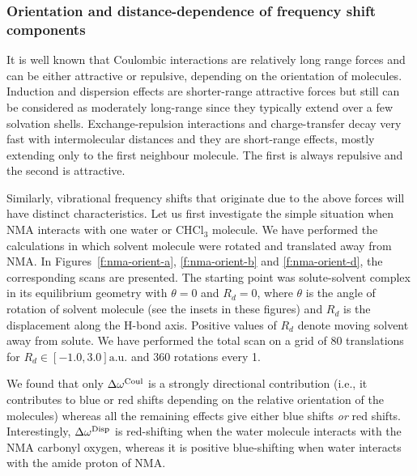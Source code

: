 \documentclass[a4paper,titlepage,twoside,fleqn,12pt]{book}
\begin{document}
\begin{refsection}
\subsubsection{Orientation and distance\hyp{}dependence of frequency shift components\label{s:amide-I-orient}}

It is well known that Coulombic interactions are relatively long range forces
and can be either attractive or repulsive, depending on the orientation
of molecules.
Induction and dispersion effects are shorter\hyp{}range attractive forces but still
can be considered as moderately long\hyp{}range since they typically
extend over a few solvation shells. Exchange\hyp{}repulsion interactions
and charge\hyp{}transfer decay very fast with intermolecular distances
and they are short\hyp{}range effects, mostly extending only to the first
neighbour molecule. The first is always repulsive and the second is attractive.

Similarly, vibrational frequency shifts that originate due to the above
forces will have distinct characteristics. Let us first investigate
the simple situation when NMA interacts with one water or CHCl$_3$ molecule.
We have performed the calculations in which solvent molecule were rotated
and translated away from NMA. In Figures~\ref{f:nma-orient-a}, \ref{f:nma-orient-b}
and \ref{f:nma-orient-d}, the corresponding scans are presented.
The starting point was solute\hyp{}solvent complex in its equilibrium geometry
with $\theta=0$ and $R_d=0$, where $\theta$ is the angle of rotation of solvent
molecule (see the insets in these figures) and $R_d$ is the displacement along the H-bond axis.
Positive values of $R_d$ denote moving solvent away from solute. We have performed
the total scan on a grid of 80 translations for $R_d\in [-1.0,3.0]\text{a.u.}$ 
and 360 rotations every 1\textdegree.

We found that only $\Delta\omega^{\rm Coul}$ is a strongly directional
contribution (i.e., it contributes to blue or red shifts depending on the
relative orientation of the molecules) whereas all the remaining effects
give either blue shifts \emph{or} red shifts. Interestingly, $\Delta\omega^{\rm Disp}$
is red\hyp{}shifting when
the water molecule interacts with the NMA carbonyl oxygen,
whereas it is positive blue-shifting when water interacts with
the amide proton of NMA.


\end{refsection}
\end{document}
